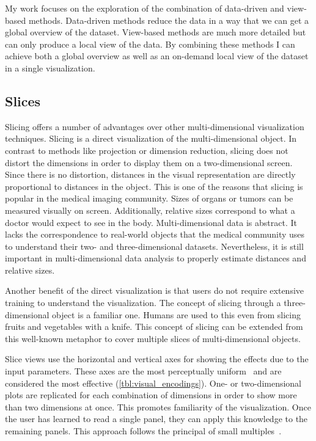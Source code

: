 My work focuses on the exploration of the combination of data-driven and
view-based methods.  Data-driven methods reduce the data in a way that we can
get a global overview of the dataset. View-based methods are much more detailed
but can only produce a local view of the data. By combining these methods I can
achieve both a global overview as well as an on-demand local view of the
dataset in a single visualization. 


\subsection{Slices}
\label{sec:slicing-advantages}

Slicing offers a number of advantages over other multi-dimensional
visualization techniques. Slicing is a direct visualization of the
multi-dimensional object. In contrast to methods like projection or dimension
reduction, slicing does not distort the dimensions in order to display them on
a two-dimensional screen. Since there is no distortion, distances in the visual
representation are directly proportional to distances in the object. This is
one of the reasons that slicing is popular in the medical imaging community.
Sizes of organs or tumors can be measured visually on screen. Additionally,
relative sizes correspond to what a doctor would expect to see in the body.
Multi-dimensional data is abstract. It lacks the correspondence to real-world
objects that the medical community uses to understand their two- and
three-dimensional datasets. Nevertheless, it is still important in
multi-dimensional data analysis to properly estimate distances and relative
sizes. 

Another benefit of the direct visualization is that users do not require
extensive training to understand the visualization. The concept of slicing
through a three-dimensional object is a familiar one. Humans are used to this
even from slicing fruits and vegetables with a knife. This concept of slicing
can be extended from this well-known metaphor to cover multiple slices of
multi-dimensional objects.

Slice views use the horizontal and vertical axes for showing the effects due to
the input parameters. These axes are the most perceptually
uniform~\cite{Stevens:1957} and are considered the most effective
(\autoref{tbl:visual_encodings}). One- or two-dimensional
plots are replicated for each combination of dimensions in order to show more
than two dimensions at once. This promotes familiarity of the visualization.
Once the user has learned to read a single panel, they can apply this knowledge
to the remaining panels. This approach follows the principal of small
multiples~\cite{Archambault:2011}. 

